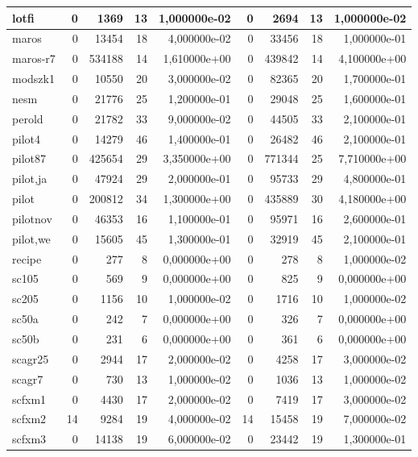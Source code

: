 \begin{tabular}{|l|r|r|r|r|r|r|r|r|}
lotfi & 0 & 1369 & 13 & 1,000000e-02 & 0 & 2694 & 13 & 1,000000e-02 \\ \hline
maros & 0 & 13454 & 18 & 4,000000e-02 & 0 & 33456 & 18 & 1,000000e-01 \\ \hline
maros-r7 & 0 & 534188 & 14 & 1,610000e+00 & 0 & 439842 & 14 & 4,100000e+00 \\ \hline
modszk1 & 0 & 10550 & 20 & 3,000000e-02 & 0 & 82365 & 20 & 1,700000e-01 \\ \hline
nesm & 0 & 21776 & 25 & 1,200000e-01 & 0 & 29048 & 25 & 1,600000e-01 \\ \hline
perold & 0 & 21782 & 33 & 9,000000e-02 & 0 & 44505 & 33 & 2,100000e-01 \\ \hline
pilot4 & 0 & 14279 & 46 & 1,400000e-01 & 0 & 26482 & 46 & 2,100000e-01 \\ \hline
pilot87 & 0 & 425654 & 29 & 3,350000e+00 & 0 & 771344 & 25 & 7,710000e+00 \\ \hline
pilot,ja & 0 & 47924 & 29 & 2,000000e-01 & 0 & 95733 & 29 & 4,800000e-01 \\ \hline
pilot & 0 & 200812 & 34 & 1,300000e+00 & 0 & 435889 & 30 & 4,180000e+00 \\ \hline
pilotnov & 0 & 46353 & 16 & 1,100000e-01 & 0 & 95971 & 16 & 2,600000e-01 \\ \hline
pilot,we & 0 & 15605 & 45 & 1,300000e-01 & 0 & 32919 & 45 & 2,100000e-01 \\ \hline
recipe & 0 & 277 & 8 & 0,000000e+00 & 0 & 278 & 8 & 1,000000e-02 \\ \hline
sc105 & 0 & 569 & 9 & 0,000000e+00 & 0 & 825 & 9 & 0,000000e+00 \\ \hline
sc205 & 0 & 1156 & 10 & 1,000000e-02 & 0 & 1716 & 10 & 1,000000e-02 \\ \hline
sc50a & 0 & 242 & 7 & 0,000000e+00 & 0 & 326 & 7 & 0,000000e+00 \\ \hline
sc50b & 0 & 231 & 6 & 0,000000e+00 & 0 & 361 & 6 & 0,000000e+00 \\ \hline
scagr25 & 0 & 2944 & 17 & 2,000000e-02 & 0 & 4258 & 17 & 3,000000e-02 \\ \hline
scagr7 & 0 & 730 & 13 & 1,000000e-02 & 0 & 1036 & 13 & 1,000000e-02 \\ \hline
scfxm1 & 0 & 4430 & 17 & 2,000000e-02 & 0 & 7419 & 17 & 3,000000e-02 \\ \hline
scfxm2 & 14 & 9284 & 19 & 4,000000e-02 & 14 & 15458 & 19 & 7,000000e-02 \\ \hline
scfxm3 & 0 & 14138 & 19 & 6,000000e-02 & 0 & 23442 & 19 & 1,300000e-01 \\ \hline

\end{tabular}
